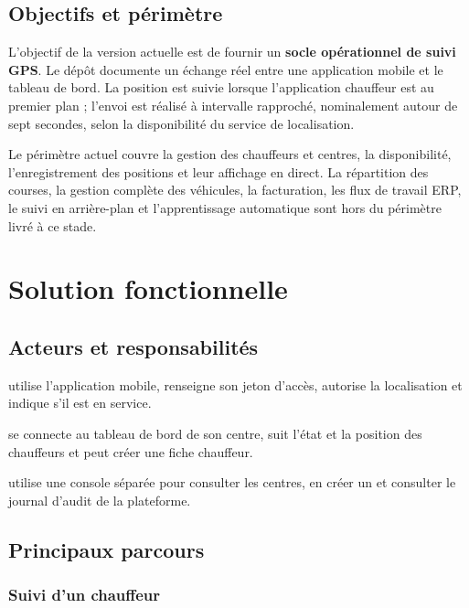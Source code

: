 \documentclass[11pt,a4paper,oneside]{report}
\newcommand{\important}[1]{\textcolor{fleetgreen}{\textbf{#1}}}
\begin{document}
\section{Objectifs et périmètre}

L'objectif de la version actuelle est de fournir un \important{socle
opérationnel de suivi GPS}. Le dépôt documente un échange réel entre une
application mobile et le tableau de bord. La position est suivie lorsque
l'application chauffeur est au premier plan ; l'envoi est réalisé à intervalle
rapproché, nominalement autour de sept secondes, selon la disponibilité du
service de localisation.

Le périmètre actuel couvre la gestion des chauffeurs et centres, la disponibilité,
l'enregistrement des positions et leur affichage en direct. La répartition des
courses, la gestion complète des véhicules, la facturation, les flux de travail
ERP, le suivi en arrière-plan et l'apprentissage automatique sont hors du
périmètre livré à ce stade.

\chapter{Solution fonctionnelle}

\section{Acteurs et responsabilités}

\begin{description}[style=nextline,leftmargin=3.5cm,labelwidth=3.2cm]
  \item[Chauffeur] utilise l'application mobile, renseigne son jeton d'accès,
        autorise la localisation et indique s'il est en service.
  \item[Administrateur de centre] se connecte au tableau de bord de son centre,
        suit l'état et la position des chauffeurs et peut créer une fiche
        chauffeur.
  \item[Responsable de plateforme] utilise une console séparée pour consulter
        les centres, en créer un et consulter le journal d'audit de la
        plateforme.
\end{description}

\section{Principaux parcours}

\subsection{Suivi d'un chauffeur}
\end{document}
